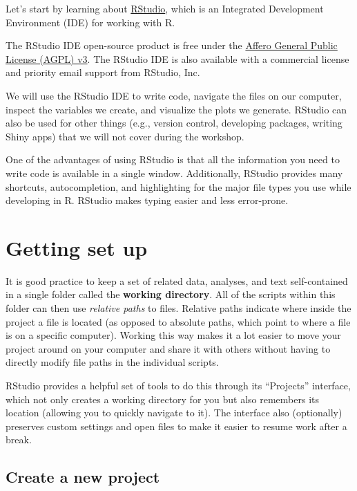 \documentclass[]{book}
\begin{document}
Let's start by learning about \href{https://www.rstudio.com/}{RStudio},
which is an Integrated Development Environment (IDE) for working with R.

The RStudio IDE open-source product is free under the
\href{https://www.gnu.org/licenses/agpl-3.0.en.html}{Affero General
Public License (AGPL) v3}. The RStudio IDE is also available with a
commercial license and priority email support from RStudio, Inc.

We will use the RStudio IDE to write code, navigate the files on our
computer, inspect the variables we create, and visualize the plots we
generate. RStudio can also be used for other things (e.g., version
control, developing packages, writing Shiny apps) that we will not cover
during the workshop.

One of the advantages of using RStudio is that all the information you
need to write code is available in a single window. Additionally,
RStudio provides many shortcuts, autocompletion, and highlighting for
the major file types you use while developing in R. RStudio makes typing
easier and less error-prone.

\section{Getting set up}\label{getting-set-up}

It is good practice to keep a set of related data, analyses, and text
self-contained in a single folder called the \textbf{working directory}.
All of the scripts within this folder can then use \emph{relative paths}
to files. Relative paths indicate where inside the project a file is
located (as opposed to absolute paths, which point to where a file is on
a specific computer). Working this way makes it a lot easier to move
your project around on your computer and share it with others without
having to directly modify file paths in the individual scripts.

RStudio provides a helpful set of tools to do this through its
``Projects'' interface, which not only creates a working directory for
you but also remembers its location (allowing you to quickly navigate to
it). The interface also (optionally) preserves custom settings and open
files to make it easier to resume work after a break.

\subsection{Create a new project}\label{create-a-new-project}
\end{document}
